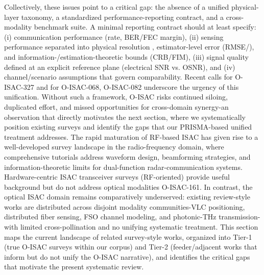 {} Collectively, these issues point to a critical gap: the absence of a unified physical-layer taxonomy, a standardized performance-reporting contract, and a cross-modality benchmark suite. A minimal reporting contract should at least specify: (i) communication performance (rate, BER/FEC margin), (ii) sensing performance separated into physical resolution , estimator-level error (RMSE/), and information-/estimation-theoretic bounds (CRB/FIM), (iii) signal quality defined at an explicit reference plane (electrical SNR vs. OSNR), and (iv) channel/scenario assumptions that govern comparability. Recent calls for  O-ISAC-327 and for  O-ISAC-068, O-ISAC-082 underscore the urgency of this unification. Without such a framework, O-ISAC risks continued siloing, duplicated effort, and missed opportunities for cross-domain synergy-an observation that directly motivates the next section, where we systematically position existing surveys and identify the gaps that our PRISMA-based unified treatment addresses.\markdownRendererInterblockSeparator
{}
\markdownRendererSectionEnd \markdownRendererSectionBegin
{}\markdownRendererInterblockSeparator
{}The rapid maturation of RF-based ISAC has given rise to a well-developed survey landscape in the radio-frequency domain, where comprehensive tutorials address waveform design, beamforming strategies, and information-theoretic limits for dual-function radar-communication systems. Hardware-centric ISAC transceiver surveys (RF-oriented) provide useful background but do not address optical modalities O-ISAC-161. In contrast, the optical ISAC domain remains comparatively underserved: existing review-style works are distributed across disjoint modality communities-VLC positioning, distributed fiber sensing, FSO channel modeling, and photonic-THz transmission-with limited cross-pollination and no unifying systematic treatment. This section maps the current landscape of related survey-style works, organized into Tier-1 (true O-ISAC surveys within our corpus) and Tier-2 (feeder/adjacent works that inform but do not unify the O-ISAC narrative), and identifies the critical gaps that motivate the present systematic review.\markdownRendererParagraphSeparator
